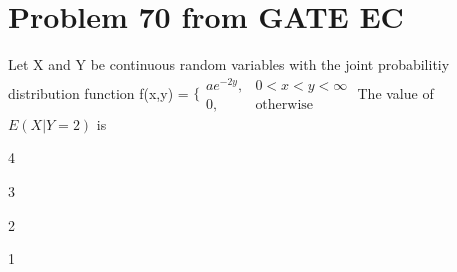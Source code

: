 \documentclass[journal,12pt,twocolumn]{IEEEtran}
\begin{document}
\section{\textbf{Problem 70 from GATE EC}}
Let X and Y be continuous random variables with the joint probabilitiy distribution function\newline
f(x,y) = $\bigg\{ \begin{array}{lr}
    ae^{-2y}, & 0<x<y<\infty  \\
     0, &\text{otherwise} 
\end{array}$\newline
The value of $E(X|Y=2)$ is \newline
\begin{inparaenum}[(A)]
\item 4 \hspace{1cm}
\item 3 \hspace{1cm}
\item 2 \hspace{1cm}
\item 1 \hspace{1cm}
\end{inparaenum}
\end{document}
